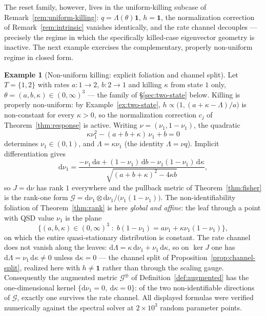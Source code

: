 \documentclass[11pt,reqno]{amsart}
\theoremstyle{plain}
\theoremstyle{definition}
\newtheorem{example}[theorem]{Example}
\theoremstyle{remark}
\newcommand{\one}{\mathbf{1}}
\newcommand{\dd}{\mathrm{d}}
\begin{document}
The reset family, however, lives in the uniform-killing subcase of
Remark~\ref{rem:uniform-killing}: $q=\Lambda(\theta)\one$, $h=\one$, the
normalization correction of Remark~\ref{rem:intrinsic} vanishes identically, and
the rate channel decouples --- precisely the regime in which the specifically
killed-case eigenvector geometry is inactive. The next example exercises the
complementary, properly non-uniform regime in closed form.

\begin{example}[Non-uniform killing: explicit foliation and channel split]\label{ex:nonuniform}
Let $T=\{1,2\}$ with rates $a\colon1\to2$, $b\colon2\to1$ and killing $\kappa$
from state $1$ only, $\theta=(a,b,\kappa)\in(0,\infty)^{3}$ --- the family of
\S\ref{sec:two-state} below. Killing is properly non-uniform: by
Example~\ref{ex:two-state}, $h\propto\bigl(1,(a+\kappa-\Lambda)/a\bigr)$ is
non-constant for every $\kappa>0$, so the normalization correction $c_j$ of
Theorem~\ref{thm:response} is active. Writing $\nu=(\nu_1,1-\nu_1)$, the
quadratic
\[
\kappa\nu_1^{2}-(a+b+\kappa)\,\nu_1+b=0
\]
determines $\nu_1\in(0,1)$, and $\Lambda=\kappa\nu_1$ (the identity
$\Lambda=\nu q$). Implicit differentiation gives
\[
\dd\nu_1
=
\frac{-\nu_1\,\dd a+(1-\nu_1)\,\dd b-\nu_1(1-\nu_1)\,\dd\kappa}
{\sqrt{(a+b+\kappa)^{2}-4\kappa b}},
\]
so $J=\dd\nu$ has rank $1$ everywhere and the pullback metric of
Theorem~\ref{thm:fisher} is the rank-one form
$\mathcal G=\dd\nu_1\otimes\dd\nu_1/\bigl(\nu_1(1-\nu_1)\bigr)$. The
non-identifiability foliation of Theorem~\ref{thm:rank} is here \emph{global and
affine}: the leaf through a point with QSD value $\nu_1$ is the plane
\[
\bigl\{(a,b,\kappa)\in(0,\infty)^{3}\;:\;
b(1-\nu_1)=a\nu_1+\kappa\nu_1(1-\nu_1)\bigr\},
\]
on which the entire quasi-stationary distribution is constant. The rate channel
does not vanish along the leaves: $\dd\Lambda=\kappa\,\dd\nu_1+\nu_1\,\dd\kappa$,
so on $\ker J$ one has $\dd\Lambda=\nu_1\,\dd\kappa\neq0$ unless $\dd\kappa=0$ ---
the channel split of Proposition~\ref{prop:channel-split}, realized here with
$h\neq\one$ rather than through the scaling gauge. Consequently the augmented
metric $\mathcal G^{\oplus}$ of Definition~\ref{def:augmented} has the
one-dimensional kernel $\{\dd\nu_1=0,\ \dd\kappa=0\}$: of the two
non-identifiable directions of $\mathcal G$, exactly one survives the rate
channel. All displayed formulas were verified numerically against the spectral
solver at $2\times10^{3}$ random parameter points.
\end{example}
\end{document}
